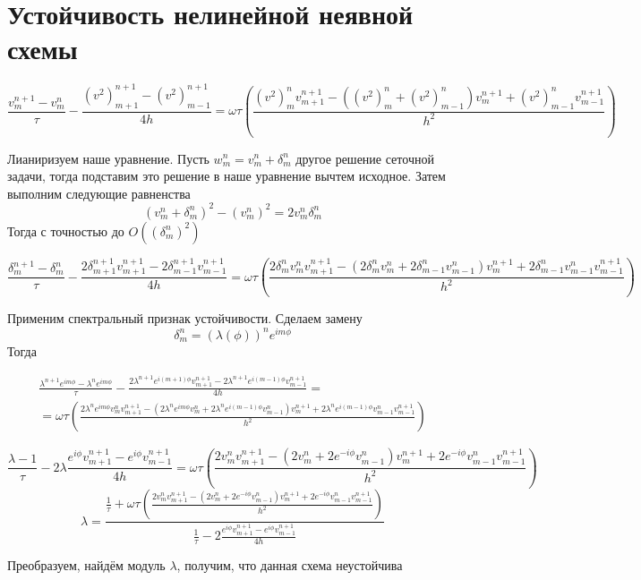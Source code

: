 \section{Устойчивость нелинейной неявной схемы}

\[
\frac{v_{m}^{n+1} - v_m^n}{\tau}  -\frac{\left(v^2\right)_{m+1}^{n+1} - \left(v^2\right)_{m-1}^{n+1}}{4h} = \omega \tau \left(\frac{\left(v^2\right)_{m}^{n}v_{m+1}^{n+1} 
- \left(\left(v^2\right)_{m}^{n} + \left(v^2\right)_{m-1}^{n}\right)v_{m}^{n+1} 
+ \left(v^2\right)_{m-1}^{n}v_{m-1}^{n+1}}{h^2}  
\right)
\]

Лианиризуем наше уравнение. Пусть $w_m^n = v_m^n + \delta_m^n$ другое решение сеточной задачи, тогда подставим это решение в наше уравнение вычтем исходное. Затем выполним следующие равненства
\[
(v_m^n + \delta_m^n)^2 - (v_m^n)^2 = 2 v_m^n \delta_m^n
\]
Тогда с точностью до $O((\delta_{m}^{n})^2)$

\[
\frac{\delta_{m}^{n+1} - \delta_m^n}{\tau}  -\frac{2\delta_{m+1}^{n+1}v_{m+1}^{n+1} - 2\delta_{m-1}^{n+1}v_{m-1}^{n+1}}{4h} = \omega \tau \left(\frac{2\delta_{m}^{n}v_{m}^{n} v_{m+1}^{n+1} 
- \left(2\delta_{m}^{n}v_{m}^{n} +2\delta_{m-1}^{n}v_{m-1}^{n}\right)v_{m}^{n+1} 
+ 2\delta_{m-1}^{n} v_{m-1}^{n} v_{m-1}^{n+1}}{h^2}  
\right)
\]

Применим спектральный признак устойчивости. 
Сделаем замену
\[
\delta_m^n = 
(\lambda(\phi))^n e^{im\phi}
\]
Тогда

\[
\begin{split}
\frac{\lambda^{n+1} e^{im\phi} - \lambda^{n} e^{im\phi} }{\tau}  -\frac{2\lambda^{n+1} e^{i(m+1)\phi} v_{m+1}^{n+1} - 2
\lambda^{n+1} e^{i(m-1)\phi}  v_{m-1}^{n+1}}{4h} =\\
= \omega \tau \left(\frac{2 \lambda^{n} e^{im\phi}v_{m}^{n} v_{m+1}^{n+1} 
- \left(2\lambda^{n} e^{im\phi} v_{m}^{n} +2\lambda^{n} e^{i(m-1)\phi} v_{m-1}^{n}\right)v_{m}^{n+1} 
+ 2\lambda^{n} e^{i(m-1)\phi} v_{m-1}^{n} v_{m-1}^{n+1}}{h^2}  
\right)
\end{split}
\]

\[
\frac{\lambda - 1 }{\tau}  - 2\lambda\frac{ e^{i\phi} v_{m+1}^{n+1} - 
 e^{i\phi}  v_{m-1}^{n+1}}{4h} =
 \omega \tau \left(\frac{2v_{m}^{n} v_{m+1}^{n+1} 
- \left(2 v_{m}^{n} +2 e^{-i\phi} v_{m-1}^{n}\right)v_{m}^{n+1} 
+ 2 e^{-i\phi} v_{m-1}^{n} v_{m-1}^{n+1}}{h^2}  
\right)
\]
\[
\lambda = \frac{\frac{1 }{\tau} + 
 \omega \tau \left(\frac{2v_{m}^{n} v_{m+1}^{n+1} 
- \left(2 v_{m}^{n} +2 e^{-i\phi} v_{m-1}^{n}\right)v_{m}^{n+1} 
+ 2 e^{-i\phi} v_{m-1}^{n} v_{m-1}^{n+1}}{h^2}  
\right)}{\frac{1}{\tau}  - 2\frac{ e^{i\phi} v_{m+1}^{n+1} - 
 e^{i\phi}  v_{m-1}^{n+1}}{4h}}
\]

Преобразуем, найдём модуль $\lambda$, получим, что данная схема неустойчива